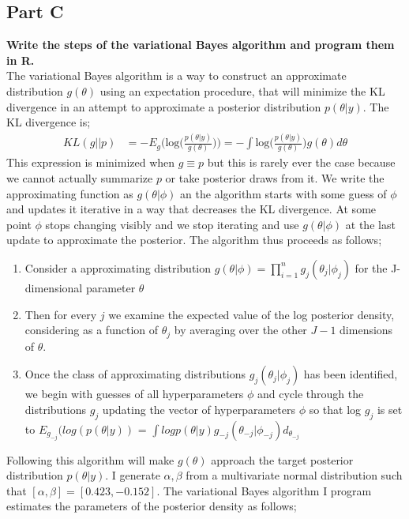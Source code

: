 \documentclass{article}
\begin{document}
\subsection{Part C}
\textbf{Write the steps of the variational Bayes algorithm and program them in R.}\\
  The variational Bayes algorithm is a way to construct an approximate distribution $g(\theta)$ using an expectation procedure, that will minimize the KL divergence in an attempt to approximate a posterior distribution $p(\theta|y)$. The KL divergence is;
  \begin{align*}
  KL(g||p) &= - E_g \Big(\text{log}\Big( \frac{p(\theta|y)}{g(\theta)}\Big)\Big) = -\int \text{log} \Big( \frac{p(\theta|y)}{g(\theta)}\Big) g(\theta) d\theta
\end{align*}
This expression is minimized when $g \equiv p$ but this is rarely ever the case because we cannot actually summarize $p$ or take posterior draws from it. We write the approximating function as $g(\theta|\phi)$ an the algorithm starts with some guess of $\phi$ and updates it iterative in a way that decreases the KL divergence. At some point $\phi$ stops changing visibly and we stop iterating and use $g(\theta|\phi)$ at the last update to approximate the posterior.
The algorithm thus proceeds as follows;
\begin{enumerate}
\item{Consider a approximating distribution $g(\theta|\phi) = \prod_{i=1}^{n} g_j(\theta_j|\phi_j)$ for the J-dimensional parameter $\theta$}
\item{Then for every $j$ we examine the expected value of the log posterior density, considering as a function of $\theta_j$ by averaging over the other $J-1$ dimensions of $\theta$.}
\item{Once the class of approximating distributions $g_j(\theta_j|\phi_j)$ has been identified, we begin with guesses of all hyperparameters $\phi$ and cycle through the distributions $g_j$ updating the vector of hyperparameters $\phi$ so that log $g_j$ is set to $E_{g_{-j}}(log(p(\theta|y))$ = $\int log p(\theta|y) g_{-j}(\theta_{-j}|\phi_{-j}) d_{\theta_{-j}}$ }
\end{enumerate}
 Following this algorithm will make $g(\theta)$ approach the target posterior distribution $p(\theta|y)$. I generate $\alpha, \beta$ from a multivariate normal distribution such that $[\alpha, \beta] = [0.423, -0.152]$. The variational Bayes algorithm I program estimates the parameters of the posterior density as follows;
\end{document}
